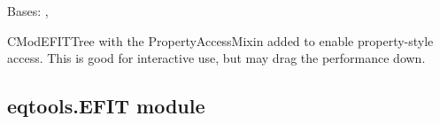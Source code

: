 \documentclass[letterpaper,10pt,english]{sphinxmanual}
\begin{document}

\begin{fulllineitems}
\label{eqtools:eqtools.CModEFIT.CModEFITTreeProp}
Bases: {\hyperref[eqtools:eqtools.CModEFIT.CModEFITTree]{}}, {\hyperref[eqtools:eqtools.core.PropertyAccessMixin]{}}

CModEFITTree with the PropertyAccessMixin added to enable property-style
access. This is good for interactive use, but may drag the performance down.

\end{fulllineitems}



\subsection{eqtools.EFIT module}
\label{eqtools:eqtools-efit-module}\label{eqtools:module-eqtools.EFIT}
\end{document}
